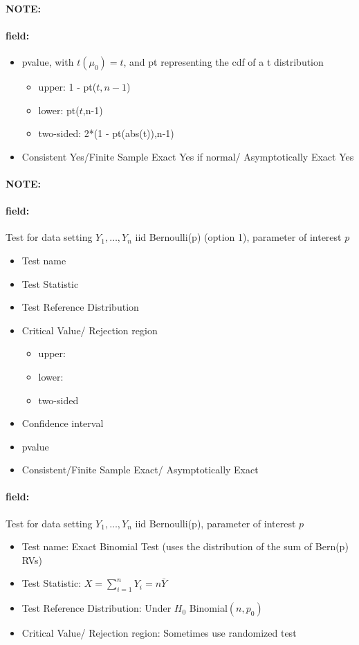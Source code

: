 \documentclass[12pt]{article}
\newenvironment{note}{\paragraph{NOTE:}}{}
\newenvironment{field}{\paragraph{field:}}{}
\begin{document}
\begin{note}
\begin{field}
\begin{itemize}
			\item pvalue, with $t(\mu_0)  = t$, and pt representing the cdf of a t distribution
			      \begin{itemize}
				      \item upper: 1 - pt($t,n-1$)
				      \item lower: pt($t$,n-1)
				      \item two-sided: 2*(1 - pt(abs(t)),n-1)
			      \end{itemize}
			\item Consistent Yes/Finite Sample Exact Yes if normal/ Asymptotically Exact Yes
		\end{itemize}
	\end{field}
\end{note}


\begin{note}
  \begin{field}
    Test for data setting $Y_1, \ldots, Y_n$ iid Bernoulli(p) (option 1), parameter of interest $p$
    \begin{itemize}
			\item Test name
			\item Test Statistic
			\item Test Reference Distribution
			\item Critical Value/ Rejection region
			      \begin{itemize}
				      \item upper:
				      \item lower:
				      \item two-sided
			      \end{itemize}
			\item Confidence interval
			\item pvalue
			\item Consistent/Finite Sample Exact/ Asymptotically Exact
		\end{itemize}
  \end{field}
  \begin{field}
    Test for data setting $Y_1, \ldots, Y_n$ iid Bernoulli(p), parameter of interest $p$
    \begin{itemize}
      \item Test name: Exact Binomial Test (uses the distribution of the sum of Bern(p) RVs)
      \item Test Statistic: $X = \sum_{i=1}^n Y_i = n\bar{Y}$
      \item Test Reference Distribution: Under $H_0$ Binomial$(n,p_0)$
      \item Critical Value/ Rejection region: Sometimes use randomized test

\end{itemize}
\end{field}
\end{note}
\end{document}

